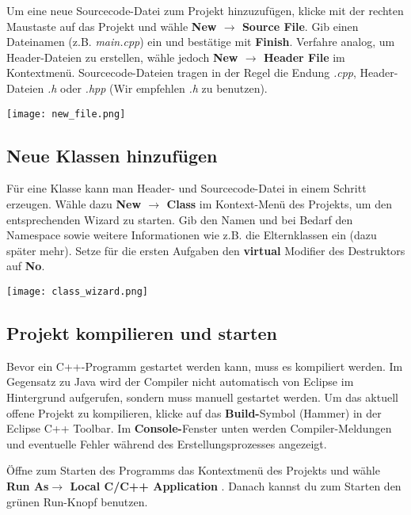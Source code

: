 Um eine neue Sourcecode-Datei zum Projekt hinzuzufügen, klicke mit der rechten Maustaste auf das Projekt und wähle \textbf{New $\rightarrow$ Source File}.
Gib einen Dateinamen (z.B. \emph{main.cpp}) ein und bestätige mit 
\textbf{Finish}. 
Verfahre analog, um Header-Dateien zu erstellen, wähle jedoch \textbf{New $\rightarrow$ Header File} im Kontextmenü.
Sourcecode-Dateien tragen in der Regel die Endung \emph{.cpp}, Header-Dateien \emph{.h} oder \emph{.hpp} (Wir empfehlen \emph{.h} zu benutzen).

\begin{center}
	\texttt{[image: new\_file.png]}
\end{center}

\subsection{Neue Klassen hinzufügen}

Für eine Klasse kann man Header- und Sourcecode-Datei in einem Schritt erzeugen.
Wähle dazu \textbf{New $\rightarrow$ Class} im Kontext-Menü des Projekts, um den entsprechenden Wizard zu starten.
Gib den Namen und bei Bedarf den Namespace sowie weitere Informationen wie z.B. die Elternklassen ein (dazu später mehr).
Setze für die ersten Aufgaben den \textbf{virtual} Modifier des Destruktors auf \textbf{No}.

\begin{center}
	\texttt{[image: class\_wizard.png]}
\end{center}

\subsection{Projekt kompilieren und starten}

Bevor ein C++-Programm gestartet werden kann, muss es kompiliert werden.
Im Gegensatz zu Java wird der Compiler nicht automatisch von Eclipse im Hintergrund aufgerufen, sondern muss manuell gestartet werden.
Um das aktuell offene Projekt zu kompilieren, klicke auf das \textbf{Build-}Symbol (\glqq Hammer\grqq) in der Eclipse C++ Toolbar.
Im \textbf{Console-}Fenster unten werden Compiler-Meldungen und eventuelle Fehler während des Erstellungsprozesses angezeigt.

Öffne zum Starten des Programms das Kontextmenü des Projekts und wähle \textbf{Run As$\rightarrow$ Local C/C++ Application }.
Danach kannst du zum Starten den grünen Run-Knopf benutzen.

